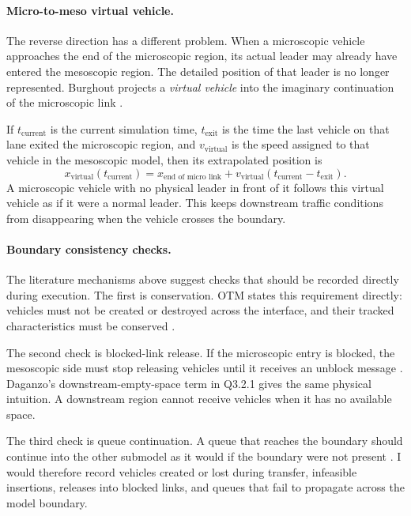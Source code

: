 \begin{bibunit}[plainnat]
\paragraph*{Micro-to-meso virtual vehicle.}
The reverse direction has a different problem. When a microscopic vehicle
approaches the end of the microscopic region, its actual leader may already
have entered the mesoscopic region. The detailed position of that leader is no
longer represented. Burghout projects a \textit{virtual vehicle} into the
imaginary continuation of the microscopic link
\citep{burghout2004thesis,burghout2005hybrid}.

If $t_{\mathrm{current}}$ is the current simulation time,
$t_{\mathrm{exit}}$ is the time the last vehicle on that lane exited the
microscopic region, and $v_{\mathrm{virtual}}$ is the speed assigned to that
vehicle in the mesoscopic model, then its extrapolated position is
\[
  x_{\mathrm{virtual}}(t_{\mathrm{current}})
  =
  x_{\text{end of micro link}}
  +
  v_{\mathrm{virtual}}
  (t_{\mathrm{current}}-t_{\mathrm{exit}}).
\]
A microscopic vehicle with no physical leader in front of it follows this
virtual vehicle as if it were a normal leader. This keeps downstream traffic
conditions from disappearing when the vehicle crosses the boundary.

\paragraph*{Boundary consistency checks.}
The literature mechanisms above suggest checks that should be recorded directly
during execution. The first is conservation. OTM states this requirement
directly: vehicles must not be created or destroyed across the interface, and
their tracked characteristics must be conserved \citep{gomes2022otm}.

The second check is blocked-link release. If the microscopic entry is blocked,
the mesoscopic side must stop releasing vehicles until it receives an unblock
message \citep{burghout2005hybrid}. Daganzo's downstream-empty-space term in
Q3.2.1 gives the same physical intuition. A downstream region cannot receive
vehicles when it has no available space.

The third check is queue continuation. A queue that reaches the boundary should
continue into the other submodel as it would if the boundary were not present
\citep{burghout2005hybrid}. I would therefore record vehicles created or lost
during transfer, infeasible insertions, releases into blocked links, and queues
that fail to propagate across the model boundary.


\end{bibunit}

